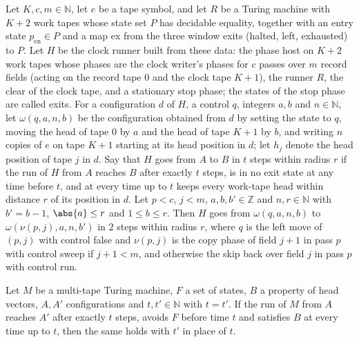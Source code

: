 \begin{lemma}
\label{Turing.cw_seg_left}
\leanok
{}
Let $K,c,m\in\mathbb{N}$, let $e$ be a tape symbol, and let $R$ be a Turing machine with $K+2$
work tapes whose state set $P$ has decidable equality, together with an entry state
$p_{\mathrm{en}}\in P$ and a map $\mathrm{ex}$ from the three window exits (halted, left,
exhausted) to $P$. Let $H$ be the clock runner built from these data: the phase host on $K+2$
work tapes whose phases are the clock writer's phases for $c$ passes over $m$ record fields
(acting on the record tape $0$ and the clock tape $K+1$), the runner $R$, the clear of the
clock tape, and a stationary stop phase; the states of the stop phase are called exits. For a
configuration $d$ of $H$, a control $q$, integers $a,b$ and $n\in\mathbb{N}$, let
$\omega(q,a,n,b)$ be the configuration obtained from $d$ by setting the state to $q$, moving
the head of tape $0$ by $a$ and the head of tape $K+1$ by $b$, and writing $n$ copies of $e$ on
tape $K+1$ starting at its head position in $d$; let $h_j$ denote the head position of tape $j$
in $d$. Say that $H$ goes from $A$ to $B$ in $t$ steps within radius $r$ if the run of $H$ from
$A$ reaches $B$ after exactly $t$ steps, is in no exit state at any time before $t$, and at
every time up to $t$ keeps every work-tape head within distance $r$ of its position in $d$. Let
$p<c$, $j<m$, $a,b,b'\in\mathbb{Z}$ and $n,r\in\mathbb{N}$ with $b'=b-1$, $\abs{a}\le r$ and
$1\le b\le r$. Then $H$ goes from $\omega(q,a,n,b)$ to $\omega(\nu(p,j),a,n,b')$ in $2$ steps
within radius $r$, where $q$ is the left move of $(p,j)$ with control false and $\nu(p,j)$ is
the copy phase of field $j+1$ in pass $p$ with control sweep if $j+1<m$, and otherwise the skip
back over field $j$ in pass $p$ with control run.
\end{lemma}

\begin{lemma}
\label{Turing.cw_seg_time}
\leanok
{}
Let $M$ be a multi-tape Turing machine, $F$ a set of states, $B$ a property of head vectors,
$A,A'$ configurations and $t,t'\in\mathbb{N}$ with $t=t'$. If the run of $M$ from $A$ reaches
$A'$ after exactly $t$ steps, avoids $F$ before time $t$ and satisfies $B$ at every time up to
$t$, then the same holds with $t'$ in place of $t$.
\end{lemma}


